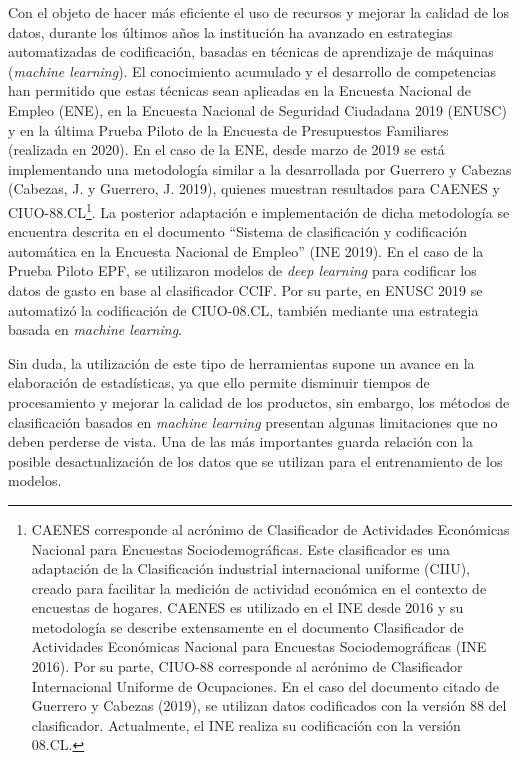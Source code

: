 \documentclass[
  12pt,
  spanish,
]{article}
\begin{document}
Con el objeto de hacer más eficiente el uso de recursos y mejorar la
calidad de los datos, durante los últimos años la institución ha
avanzado en estrategias automatizadas de codificación, basadas en
técnicas de aprendizaje de máquinas (\emph{machine learning}). El
conocimiento acumulado y el desarrollo de competencias han permitido que
estas técnicas sean aplicadas en la Encuesta Nacional de Empleo (ENE),
en la Encuesta Nacional de Seguridad Ciudadana 2019 (ENUSC) y en la
última Prueba Piloto de la Encuesta de Presupuestos Familiares
(realizada en 2020). En el caso de la ENE, desde marzo de 2019 se está
implementando una metodología similar a la desarrollada por Guerrero y
Cabezas (Cabezas, J. y Guerrero, J. 2019), quienes muestran resultados
para CAENES y CIUO-88.CL\footnote{CAENES corresponde al acrónimo de
  Clasificador de Actividades Económicas Nacional para Encuestas
  Sociodemográficas. Este clasificador es una adaptación de la
  Clasificación industrial internacional uniforme (CIIU), creado para
  facilitar la medición de actividad económica en el contexto de
  encuestas de hogares. CAENES es utilizado en el INE desde 2016 y su
  metodología se describe extensamente en el documento Clasificador de
  Actividades Económicas Nacional para Encuestas Sociodemográficas (INE
  2016). Por su parte, CIUO-88 corresponde al acrónimo de Clasificador
  Internacional Uniforme de Ocupaciones. En el caso del documento citado
  de Guerrero y Cabezas (2019), se utilizan datos codificados con la
  versión 88 del clasificador. Actualmente, el INE realiza su
  codificación con la versión 08.CL.}. La posterior adaptación e
implementación de dicha metodología se encuentra descrita en el
documento ``Sistema de clasificación y codificación automática en la
Encuesta Nacional de Empleo'' (INE 2019). En el caso de la Prueba Piloto
EPF, se utilizaron modelos de \emph{deep learning} para codificar los
datos de gasto en base al clasificador CCIF. Por su parte, en ENUSC 2019
se automatizó la codificación de CIUO-08.CL, también mediante una
estrategia basada en \emph{machine learning}.

Sin duda, la utilización de este tipo de herramientas supone un avance
en la elaboración de estadísticas, ya que ello permite disminuir tiempos
de procesamiento y mejorar la calidad de los productos, sin embargo, los
métodos de clasificación basados en \emph{machine learning} presentan
algunas limitaciones que no deben perderse de vista. Una de las más
importantes guarda relación con la posible desactualización de los datos
que se utilizan para el entrenamiento de los modelos.
\end{document}
